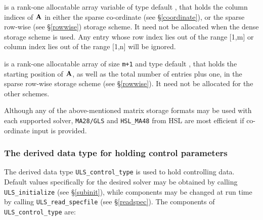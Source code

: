 \documentclass{galahad}
\newcommand{\packagename}{ULS}
\begin{document}
\begin{description}
 is a rank-one allocatable array variable of type default \integer,
that holds the column indices of ${\mathbf{A}}$ in either the sparse co-ordinate
(see \S\ref{coordinate}), or the sparse row-wise
(see \S\ref{rowwise}) storage scheme.
It need not be allocated when the dense
storage scheme is used.
Any entry whose row index lies out of the range $[$1,m$]$ or
column index lies out of the range $[$1,n$]$ will be ignored.

 is a rank-one allocatable array of size {\tt m+1} and type
default \integer, that holds the starting position of ${\mathbf{A}}$, as well
as the total number of entries plus one, in the sparse row-wise storage
scheme (see \S\ref{rowwise}). It need not be allocated for the
other schemes.

\end{description}
Although any of the above-mentioned matrix storage formats may be used
with each supported solver, {\tt MA28/GLS} and {\tt HSL\_MA48}
from HSL are most efficient if co-ordinate input is provided.


\subsubsection{The derived data type for holding control
 parameters}\label{typecontrol}
The derived data type
{\tt \packagename\_control\_type}
is used to hold controlling data.
Default values specifically for the desired solver
may be obtained by calling
{\tt \packagename\_initialize}
(see \S\ref{subinit}),
while components may be changed at run time by calling
{\tt \packagename\_read\-\_specfile}
(see \S\ref{readspec}).
The components of
{\tt \packagename\_control\_type}
are:
\end{document}
